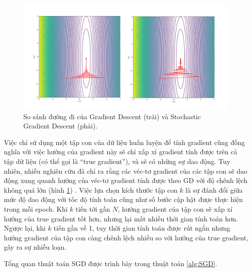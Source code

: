 \begin{figure}[H]
	\centering
	\includegraphics[width=140 mm]{images/gd-sgd.png}
	\caption{So sánh đường đi của Gradient Descent (trái) và Stochastic Gradient Descent (phải).}
	\label{fig:gd-sgd}
\end{figure}

Việc chỉ sử dụng một tập con của dữ liệu huấn luyện để tính gradient cũng đồng nghĩa với việc hướng của gradient này sẽ chỉ xấp xỉ gradient tính được trên cả tập dữ liệu (có thể gọi là ``true gradient''), và sẽ có những sự dao động. Tuy nhiên, nhiều nghiên cứu đã chỉ ra rằng các véc-tơ gradient của các tập con sẽ dao động xung quanh hướng của véc-tơ gradient tính được theo GD với độ chênh lệch không quá lớn (hình \ref{fig:gd-sgd}) \cite{bottou2010large}\cite{bottou2018optimization}. Việc lựa chọn kích thước tập con $k$ là sự đánh đổi giữa mức độ dao động với tốc độ tính toán cũng như số bước cập hật được thực hiện trong mỗi epoch. Khi $k$ tiến tới gần $N$, hướng gradient của tập con sẽ xấp xỉ hướng của true gradient tốt hơn, nhưng lại mất nhiều thời gian tính toán hơn. Ngược lại, khi $k$ tiến gần về 1, tuy thời gian tính toán được rút ngắn nhưng hướng gradient của tập con càng chênh lệch nhiều so với hướng của true gradient, gây ra sự nhiễu loạn.

Tổng quan thuật toán SGD được trình bày trong thuật toán \ref{alg:SGD}.

